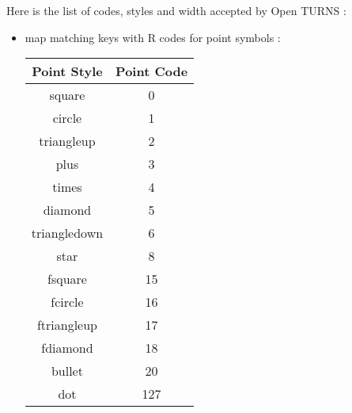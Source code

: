 Here is the list of codes, styles and width accepted by Open TURNS :
\begin{itemize}
\item map  matching keys with R codes for point symbols :

  \begin{center}
    \begin{tabular}{c|c}
      Point Style & Point Code \\
      \hline
      square & 0 \\
      \hline
      circle & 1\\
      \hline
      triangleup & 2\\
      \hline
      plus & 3\\
      \hline
      times & 4 \\
      \hline
      diamond & 5\\
      \hline
      triangledown & 6\\
      \hline
      star & 8\\
      \hline
      fsquare & 15\\
      \hline
      fcircle & 16\\
      \hline
      ftriangleup & 17\\
      \hline
      fdiamond  & 18\\
      \hline
      bullet & 20 \\
      \hline
      dot & 127
    \end{tabular}
  \end{center}


\end{itemize}

